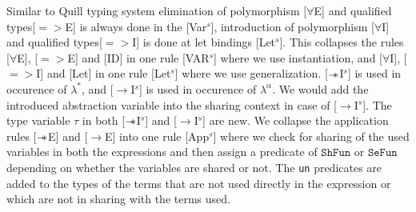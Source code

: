 Similar to Quill typing system \citep{morris_best_2016} elimination of polymorphism [$\forall$E] and qualified
types[$=>$E] is always done in the [Var$^s$], introduction of polymorphism [$\forall$I] and qualified types[$=>$I] is
done at let bindings [Let$^s$]. This collapses the rules [$\forall$E], [$=>$E] and [ID] in one rule [VAR$^s$] where
we use instantiation, and [$\forall$I], [$=>$I] and [Let] in one rule [Let$^s$] where we use generalization.
[$\mathrel{-\mkern-6mu*}$I$^s$] is used in occurence of $\lambda^{*}$, and [$\rightarrow$I$^s$] is used in occurence of $\lambda^{\alpha}$.
We would add the introduced abstraction variable into the sharing context in case of [$\rightarrow$I$^s$].
The type variable $\tau$ in both [$\mathrel{-\mkern-6mu*}$I$^s$] and [$\rightarrow$I$^s$] are new. We collapse the application rules
[$\mathrel{-\mkern-6mu*}$E] and [$\rightarrow$E] into one rule [App$^s$] where we check for sharing of the used variables in both
the expressions and then assign a predicate of $\texttt{ShFun}$ or $\texttt{SeFun}$ depending on whether the variables
are shared or not. The \texttt{un} predicates are added to the types of the terms that are not used directly in the expression
or which are not in sharing with the terms used.
